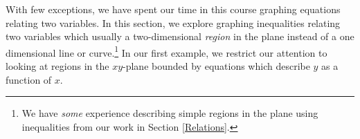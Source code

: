 

\setcounter{footnote}{0}

\label{NonLinearInequalities}

With few exceptions, we have spent our time in this course graphing equations relating two variables.  In this section, we explore graphing inequalities relating two variables which  usually a two-dimensional \textit{region} in the plane instead of a one dimensional line or curve.\footnote{We have \textit{some} experience describing simple regions in the plane using inequalities from our work in Section \ref{Relations}.}  In our first example, we restrict our attention to looking at regions in the $xy$-plane bounded by equations which describe $y$ as a function of $x$.

